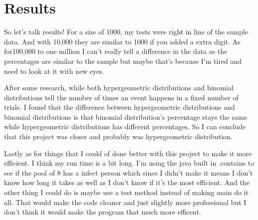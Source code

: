\documentclass[letterpaper, 10pt]{article}
\begin{document}
\section{Results}
So let's talk results! For a size of 1000, my tests were right in line of the sample data. And with 10,000 they are similar to 1000 if you added a extra digit. As for100,000 to one million I can't really tell a difference in the data as the percentages are similar to the sample but maybe that's because I'm tired and need to look at it with new eyes. \par

After some research, while both hypergeometric distributions and binomial distributions tell the number of times an event happens in a fixed number of trials. I found that the difference between hypergeometric distributions and binomial distributions is that binomial distribution's percentage stays the same while hypergeometric distributions has different percentages. So I can conclude that this project was closer and probably was  hypergeometric distribution. \par

Lastly as for things that I could of done better with this project to make it more efficient. I think my run time is a bit long. I'm using the java built in .contains to see if the pool of 8 has a infect person which since I didn't make it means I don't know how long it takes as well as I don't know if it's the most efficient. And the other thing I could do is maybe use a test method instead of making main do it all. That would make the code cleaner and just slightly more professional but I don't think it would make the program that much more efficent. 
\end{document}
